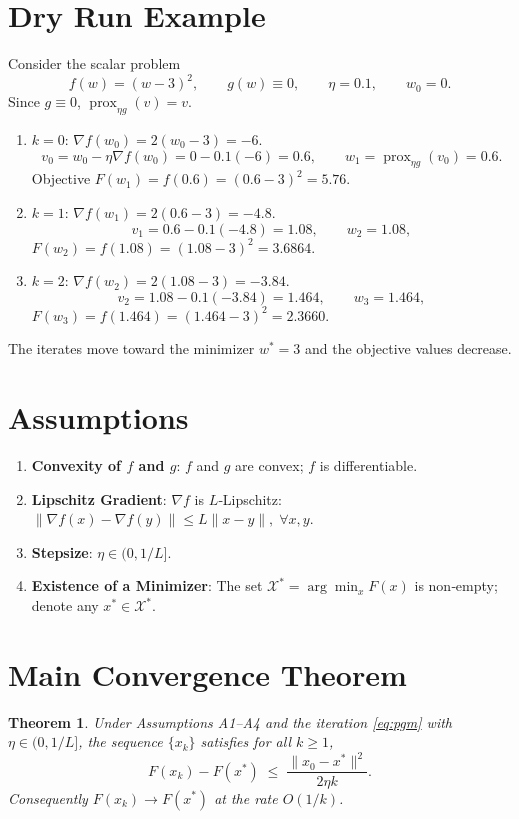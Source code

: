 \documentclass{article}
\newtheorem{theorem}{Theorem}
\newcommand{\prox}{\operatorname{prox}}
\begin{document}
\section*{Dry Run Example}
Consider the scalar problem
\[
f(w)=(w-3)^{2},\qquad g(w)\equiv0,\qquad \eta=0.1,\qquad w_{0}=0.
\]
Since $g\equiv0$, $\prox_{\eta g}(v)=v$.
\begin{enumerate}
  \item $k=0$: $\nabla f(w_{0})=2(w_{0}-3)=-6$.
        \[
        v_{0}=w_{0}-\eta\nabla f(w_{0})=0-0.1(-6)=0.6,\qquad
        w_{1}= \prox_{\eta g}(v_{0})=0.6.
        \]
        Objective $F(w_{1})=f(0.6)=(0.6-3)^{2}=5.76$.
  \item $k=1$: $\nabla f(w_{1})=2(0.6-3)=-4.8$.
        \[
        v_{1}=0.6-0.1(-4.8)=1.08,\qquad
        w_{2}=1.08,
        \]
        $F(w_{2})=f(1.08)=(1.08-3)^{2}=3.6864$.
  \item $k=2$: $\nabla f(w_{2})=2(1.08-3)=-3.84$.
        \[
        v_{2}=1.08-0.1(-3.84)=1.464,\qquad
        w_{3}=1.464,
        \]
        $F(w_{3})=f(1.464)=(1.464-3)^{2}=2.3660$.
\end{enumerate}
The iterates move toward the minimizer $w^{*}=3$ and the objective values decrease.

\newpage

\section*{Assumptions}
\begin{enumerate}[label={A\arabic*}.]
  \item \textbf{Convexity of $f$ and $g$}: $f$ and $g$ are convex; $f$ is differentiable.
  \item \textbf{Lipschitz Gradient}: $\nabla f$ is $L$‑Lipschitz:
        $\|\nabla f(x)-\nabla f(y)\|\le L\|x-y\|,\;\forall x,y$.
  \item \textbf{Stepsize}: $\eta\in(0,1/L]$.
  \item \textbf{Existence of a Minimizer}: The set 
        $\mathcal{X}^{*}=\arg\min_{x}F(x)$ is non‑empty; denote any $x^{*}\in\mathcal{X}^{*}$.
\end{enumerate}

\section*{Main Convergence Theorem}
\begin{theorem}
\label{thm:rate}
Under Assumptions A1–A4 and the iteration \eqref{eq:pgm} with $\eta\in(0,1/L]$, the sequence $\{x_{k}\}$ satisfies for all $k\ge1$,
\begin{equation}
\label{eq:rate}
F(x_{k})-F(x^{*})\;\le\;\frac{\|x_{0}-x^{*}\|^{2}}{2\eta k}.
\end{equation}
Consequently $F(x_{k})\to F(x^{*})$ at the rate $O(1/k)$.
\end{theorem}
\end{document}
